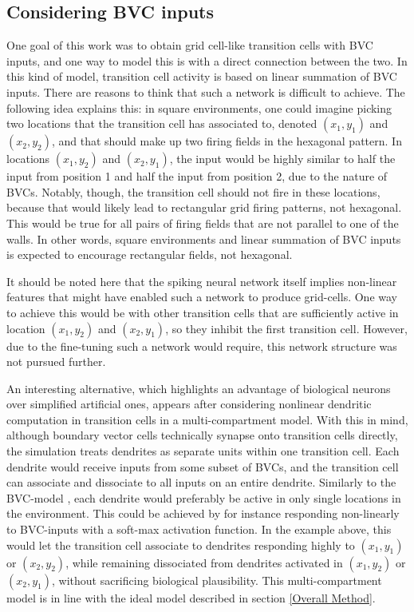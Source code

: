 \documentclass{article}
\begin{document}
    \subsection{Considering BVC inputs} \label{Considering BVC inputs}

    One goal of this work was to obtain grid cell-like transition cells with BVC inputs, and one way to model this is with a direct connection between the two. In this kind of model, transition cell activity is based on linear summation of BVC inputs. There are reasons to think that such a network is difficult to achieve. The following idea explains this: in square environments, one could imagine picking two locations that the transition cell has associated to, denoted \((x_1, y_1)\) and \((x_2, y_2)\), and that should make up two firing fields in the hexagonal pattern. In locations \((x_1, y_2)\) and \((x_2, y_1)\), the input would be highly similar to half the input from position 1 and half the input from position 2, due to the nature of BVCs. Notably, though, the transition cell should not fire in these locations, because that would likely lead to rectangular grid firing patterns, not hexagonal. This would be true for all pairs of firing fields that are not parallel to one of the walls. In other words, square environments and linear summation of BVC inputs is expected to encourage rectangular fields, not hexagonal.
    
    It should be noted here that the spiking neural network itself implies non-linear features that might have enabled such a network to produce grid-cells. One way to achieve this would be with other transition cells that are sufficiently active in location \((x_1, y_2)\) and \((x_2, y_1)\), so they inhibit the first transition cell. However, due to the fine-tuning such a network would require, this network structure was not pursued further.

    An interesting alternative, which highlights an advantage of biological neurons over simplified artificial ones, appears after considering nonlinear dendritic computation in transition cells in a multi-compartment model. With this in mind, although boundary vector cells technically synapse onto transition cells directly, the simulation treats dendrites as separate units within one transition cell. Each dendrite would receive inputs from some subset of BVCs, and the transition cell can associate and dissociate to all inputs on an entire dendrite. Similarly to the BVC-model \parencite{Barry2006}, each dendrite would preferably be active in only single locations in the environment. This could be achieved by for instance responding non-linearly to BVC-inputs with a soft-max activation function. In the example above, this would let the transition cell associate to dendrites responding highly to \((x_1, y_1)\) or \((x_2, y_2)\), while remaining dissociated from dendrites activated in \((x_1, y_2)\) or \((x_2, y_1)\), without sacrificing biological plausibility. This multi-compartment model is in line with the ideal model described in section \ref{Overall Method}.
\end{document}

